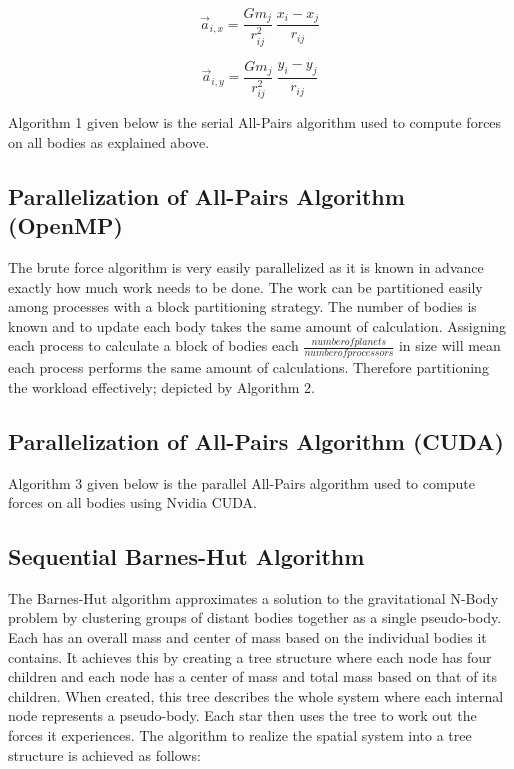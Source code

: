 \documentclass[letterpaper, 10 pt, conference]{ieeeconf}
\begin{document}
    \begin{equation}
        \label{eq:4}
        \vec{a}_{i, x} = \frac{Gm_j}{r_{ij}^2} \:
        \frac{x_i - x_j}{r_{ij}}
    \end{equation}

    \begin{equation}
        \label{eq:5}
        \vec{a}_{i, y} = \frac{Gm_j}{r_{ij}^2} \:
        \frac{y_i - y_j}{r_{ij}}
    \end{equation}

    Algorithm 1 given below is the serial All-Pairs algorithm used to compute forces on all bodies as explained above.

    \subsection{Parallelization of All-Pairs Algorithm (OpenMP)}

    The brute force algorithm is very easily parallelized as it is known in advance exactly how much work needs to be done. The work can be partitioned easily among processes with a block partitioning strategy. The number of bodies is known and to update each body takes the same amount of calculation. Assigning each process to calculate a block of bodies each $\frac{number of planets}{number of processors}$ in size will mean each process performs the same amount of calculations. Therefore partitioning the workload effectively; depicted by Algorithm 2.

    \subsection{Parallelization of All-Pairs Algorithm (CUDA)}

    Algorithm 3 given below is the parallel All-Pairs algorithm used to compute forces on all bodies using Nvidia CUDA.

    \subsection{Sequential Barnes-Hut Algorithm}

    The Barnes-Hut algorithm \cite{c8} approximates a solution to the gravitational N-Body problem by clustering groups of distant bodies together as a single pseudo-body. Each has an overall mass and center of mass based on the individual bodies it contains. It achieves this by creating a tree structure where each node has four children and each node has a center of mass and total mass based on that of its children. When created, this tree describes the whole system where each internal node represents a pseudo-body. Each star then uses the tree to work out the forces it experiences. The algorithm to realize the spatial system into a tree structure is achieved as follows:
\end{document}
